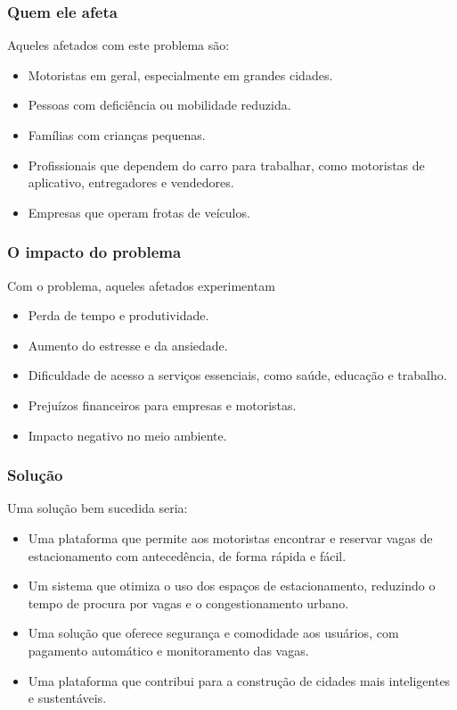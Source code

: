 \documentclass[a4paper,12pt]{article}
\begin{document}
\subsubsection{Quem ele afeta}

Aqueles afetados com este problema são:

\begin{itemize}
    \item Motoristas em geral, especialmente em grandes cidades.
    \item Pessoas com deficiência ou mobilidade reduzida.
    \item Famílias com crianças pequenas.
    \item Profissionais que dependem do carro para trabalhar, como motoristas de aplicativo, entregadores e vendedores.
    \item Empresas que operam frotas de veículos.
\end{itemize}


\subsubsection{O impacto do problema}

Com o problema, aqueles afetados experimentam

\begin{itemize}
    \item Perda de tempo e produtividade.
    \item Aumento do estresse e da ansiedade.
    \item Dificuldade de acesso a serviços essenciais, como saúde, educação e trabalho.
    \item Prejuízos financeiros para empresas e motoristas.
    \item Impacto negativo no meio ambiente.
\end{itemize}

\subsubsection{Solução}

Uma solução bem sucedida seria:

\begin{itemize}
    \item Uma plataforma que permite aos motoristas encontrar e reservar vagas de estacionamento com antecedência, de forma rápida e fácil.
    \item Um sistema que otimiza o uso dos espaços de estacionamento, reduzindo o tempo de procura por vagas e o congestionamento urbano.
    \item Uma solução que oferece segurança e comodidade aos usuários, com pagamento automático e monitoramento das vagas.
    \item Uma plataforma que contribui para a construção de cidades mais inteligentes e sustentáveis.
\end{itemize}
\end{document}

